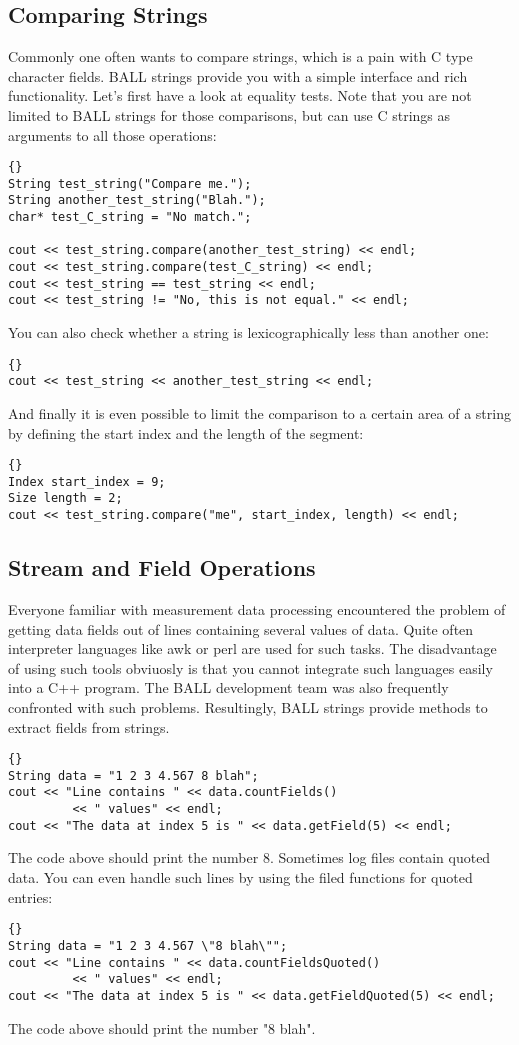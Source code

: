 \subsection{Comparing Strings}

Commonly one often wants to compare strings, which is a pain with C type
character fields. BALL strings provide you with a simple interface and rich
functionality. Let's first have a look at equality tests. Note that you are
not limited to BALL strings for those comparisons, but can use C strings
as arguments to all those operations:
\begin{lstlisting}{}
String test_string("Compare me.");
String another_test_string("Blah.");
char* test_C_string = "No match.";

cout << test_string.compare(another_test_string) << endl;
cout << test_string.compare(test_C_string) << endl;
cout << test_string == test_string << endl;
cout << test_string != "No, this is not equal." << endl;
\end{lstlisting}
You can also check whether a string is lexicographically less than another
one:
\begin{lstlisting}{}
cout << test_string << another_test_string << endl;
\end{lstlisting}
And finally it is even possible to limit the comparison to a certain area of
a string by defining the start index and the length of the segment:
\begin{lstlisting}{}
Index start_index = 9;
Size length = 2;
cout << test_string.compare("me", start_index, length) << endl;
\end{lstlisting}

\subsection{Stream and Field Operations}

Everyone familiar with measurement data processing encountered the problem of
getting data fields out of lines containing several values of data. Quite
often interpreter languages like awk or perl are used for such tasks. The
disadvantage of using such tools obviuosly is that you cannot integrate such
languages easily into a C++ program. The BALL development team was also
frequently confronted with such problems. Resultingly, BALL strings provide
methods to extract fields from strings.
\begin{lstlisting}{}
String data = "1 2 3 4.567 8 blah";
cout << "Line contains " << data.countFields() 
		 << " values" << endl;
cout << "The data at index 5 is " << data.getField(5) << endl;
\end{lstlisting}
The code above should print the number 8.
Sometimes log files contain quoted data. You can even handle such lines by
using the filed functions for quoted entries:
\begin{lstlisting}{}
String data = "1 2 3 4.567 \"8 blah\"";
cout << "Line contains " << data.countFieldsQuoted() 
		 << " values" << endl;
cout << "The data at index 5 is " << data.getFieldQuoted(5) << endl;
\end{lstlisting}
The code above should print the number "8 blah".

